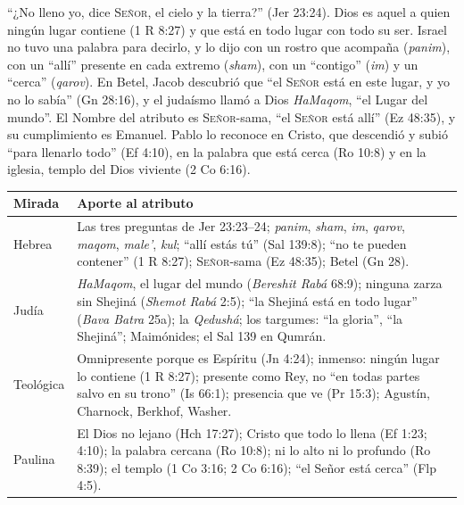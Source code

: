 \documentclass[11pt,letterpaper]{article}
\newcommand{\SENOR}{\textsc{Señor}}
\begin{document}
\begin{tcolorbox}[colback=papiro,colframe=azul,boxrule=1pt,arc=3pt]
``¿No lleno yo, dice \SENOR{}, el cielo y la tierra?'' (Jer 23:24). Dios es aquel a quien ningún lugar contiene (1 R 8:27) y que está en todo lugar con todo su ser. Israel no tuvo una palabra para decirlo, y lo dijo con un rostro que acompaña (\emph{panim}), con un ``allí'' presente en cada extremo (\emph{sham}), con un ``contigo'' (\emph{im}) y un ``cerca'' (\emph{qarov}). En Betel, Jacob descubrió que ``el \SENOR{} está en este lugar, y yo no lo sabía'' (Gn 28:16), y el judaísmo llamó a Dios \emph{HaMaqom}, ``el Lugar del mundo''. El Nombre del atributo es \SENOR{}-sama, ``el \SENOR{} está allí'' (Ez 48:35), y su cumplimiento es Emanuel. Pablo lo reconoce en Cristo, que descendió y subió ``para llenarlo todo'' (Ef 4:10), en la palabra que está cerca (Ro 10:8) y en la iglesia, templo del Dios viviente (2 Co 6:16).
\end{tcolorbox}

\begin{center}\small\renewcommand{\arraystretch}{1.3}
\begin{tabular}{@{}L{3.0cm}L{11.4cm}@{}}
\toprule
\textbf{Mirada} & \textbf{Aporte al atributo} \\ \midrule
Hebrea & Las tres preguntas de Jer 23:23--24; \emph{panim}, \emph{sham}, \emph{im}, \emph{qarov}, \emph{maqom}, \emph{male'}, \emph{kul}; ``allí estás tú'' (Sal 139:8); ``no te pueden contener'' (1 R 8:27); \SENOR{}-sama (Ez 48:35); Betel (Gn 28). \\
Judía & \emph{HaMaqom}, el lugar del mundo (\emph{Bereshit Rabá} 68:9); ninguna zarza sin Shejiná (\emph{Shemot Rabá} 2:5); ``la Shejiná está en todo lugar'' (\emph{Bava Batra} 25a); la \emph{Qedushá}; los targumes: ``la gloria'', ``la Shejiná''; Maimónides; el Sal 139 en Qumrán. \\
Teológica & Omnipresente porque es Espíritu (Jn 4:24); inmenso: ningún lugar lo contiene (1 R 8:27); presente como Rey, no ``en todas partes salvo en su trono'' (Is 66:1); presencia que ve (Pr 15:3); Agustín, Charnock, Berkhof, Washer. \\
Paulina & El Dios no lejano (Hch 17:27); Cristo que todo lo llena (Ef 1:23; 4:10); la palabra cercana (Ro 10:8); ni lo alto ni lo profundo (Ro 8:39); el templo (1 Co 3:16; 2 Co 6:16); ``el Señor está cerca'' (Flp 4:5). \\
\bottomrule
\end{tabular}\end{center}
\end{document}
